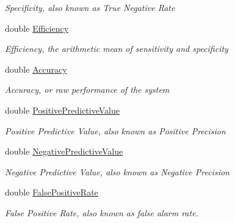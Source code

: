\begin{DoxyCompactItemize}
\begin{DoxyCompactList}\small\item\em Specificity, also known as True Negative Rate \end{DoxyCompactList}\item 
double \hyperlink{class_crowdsourcing_project_1_1_statistics_1_1_confusion_matrix_a3450802726f22c62f6fbdf97e42451a8}{Efficiency}
\begin{DoxyCompactList}\small\item\em Efficiency, the arithmetic mean of sensitivity and specificity \end{DoxyCompactList}\item 
double \hyperlink{class_crowdsourcing_project_1_1_statistics_1_1_confusion_matrix_a6cc65bbd56a6e577d4bae7650bab3897}{Accuracy}
\begin{DoxyCompactList}\small\item\em Accuracy, or raw performance of the system \end{DoxyCompactList}\item 
double \hyperlink{class_crowdsourcing_project_1_1_statistics_1_1_confusion_matrix_afb699f40850b19bba5c430eab686eff2}{Positive\+Predictive\+Value}
\begin{DoxyCompactList}\small\item\em Positive Predictive Value, also known as Positive Precision \end{DoxyCompactList}\item 
double \hyperlink{class_crowdsourcing_project_1_1_statistics_1_1_confusion_matrix_a53e260e21777e62a8880d57ae1a2d6b4}{Negative\+Predictive\+Value}
\begin{DoxyCompactList}\small\item\em Negative Predictive Value, also known as Negative Precision \end{DoxyCompactList}\item 
double \hyperlink{class_crowdsourcing_project_1_1_statistics_1_1_confusion_matrix_a883fcaefecb1086c5931cd870c2ef4b1}{False\+Positive\+Rate}
\begin{DoxyCompactList}\small\item\em False Positive Rate, also known as false alarm rate. \end{DoxyCompactList}\item 

\end{DoxyCompactItemize}
